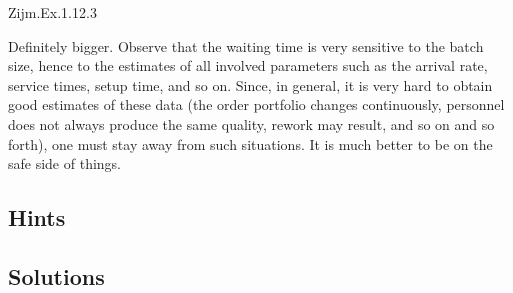 \begin{question}
Zijm.Ex.1.12.3
 \begin{solution}
   Definitely bigger. Observe that the waiting time is very sensitive
   to the batch size, hence to the estimates of all involved
   parameters such as the arrival rate, service times, setup time, and
   so on. Since, in general, it is very hard to obtain good estimates
   of these data (the order portfolio changes continuously, personnel
   does not always produce the same quality, rework may result, and so
   on and so forth), one must stay away from such situations. It is
   much better to be on the safe side of things.
\end{solution}
\end{question}







\subsection*{Hints}

\subsection*{Solutions}





